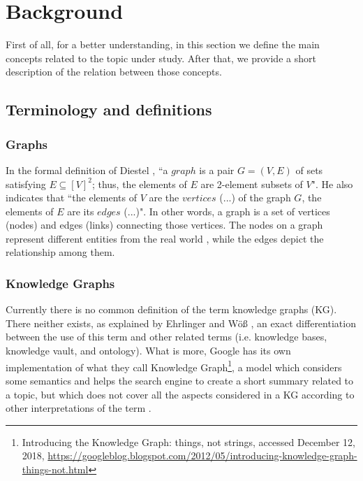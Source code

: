 \documentclass[runningheads]{llncs}
\begin{document}
\section{Background} \label{background}
First of all, for a better understanding, in this section we define the main concepts related to the topic under study. After that, we provide a short description of the relation between those concepts.

\subsection{Terminology and definitions} \label{terminology}

\subsubsection{Graphs} \label{graphs}
In the formal definition of Diestel \cite{Diestel}, ``a $graph$ is a pair $G = (V, E)$ of sets satisfying $E \subseteq [V]^2$; thus, the elements of $E$ are 2-element subsets of $V$". He also indicates that ``the elements of $V$ are the $vertices$ (...) of the graph $G$, the elements of $E$ are its $edges$ (...)". In other words, a graph is a set of vertices (nodes) and edges (links) connecting those vertices. The nodes on a graph represent different entities from the real world \cite{Robinson}, while the edges depict the relationship among them.

\subsubsection{Knowledge Graphs} \label{knowledge-graphs}
Currently there is no common definition of the term knowledge graphs
(KG). There neither exists, as explained by Ehrlinger and W{\"o}{\ss}
\cite{Ehrlinger}, an exact differentiation between the use of this term and other related terms (i.e. knowledge bases, knowledge vault, and
ontology). What is more, Google has its own implementation of what they
call Knowledge Graph\footnote{Introducing the Knowledge Graph: things, not strings, accessed December 12, 2018, \href{https://googleblog.blogspot.com/2012/05/introducing-knowledge-graph-things-not.html}
{https://googleblog.blogspot.com/2012/05/introducing-knowledge-graph-things-not.html}}, 
a model which considers some semantics and helps the search engine to create a short summary related to a topic, but which does not cover all
the aspects considered in a KG according to other interpretations of
the term \cite{Ehrlinger}.
\end{document}

